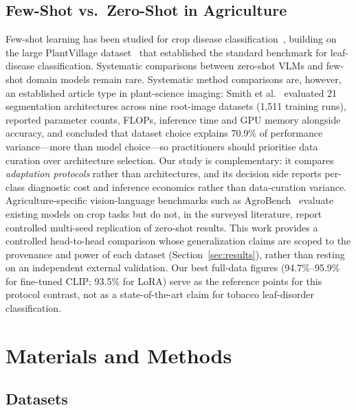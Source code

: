 \documentclass[10pt,a4paper]{article}
\begin{document}
\subsection{Few-Shot vs.\ Zero-Shot in Agriculture}

Few-shot learning has been studied for crop disease classification~\cite{argueso2020fewshot,liang2021cotton}, building on the large PlantVillage dataset~\cite{plantvillage2016} that established the standard benchmark for leaf-disease classification.
Systematic comparisons between zero-shot VLMs and few-shot domain models remain rare.
Systematic method comparisons are, however, an established article type in plant-science imaging: Smith et al.~\cite{smith2026roots} evaluated 21 segmentation architectures across nine root-image datasets (1{,}511 training runs), reported parameter counts, FLOPs, inference time and GPU memory alongside accuracy, and concluded that dataset choice explains 70.9\% of performance variance---more than model choice---so practitioners should prioritise data curation over architecture selection.
Our study is complementary: it compares \emph{adaptation protocols} rather than architectures, and its decision side reports per-class diagnostic cost and inference economics rather than data-curation variance.
Agriculture-specific vision-language benchmarks such as AgroBench~\cite{shinoda2025agrobench} evaluate existing models on crop tasks but do not, in the surveyed literature, report controlled multi-seed replication of zero-shot results.
This work provides a controlled head-to-head comparison whose generalization claims are scoped to the provenance and power of each dataset (Section~\ref{sec:results}), rather than resting on an independent external validation.
Our best full-data figures (94.7\%--95.9\% for fine-tuned CLIP; 93.5\% for LoRA) serve as the reference points for this protocol contrast, not as a state-of-the-art claim for tobacco leaf-disorder classification.

\section{Materials and Methods}
\label{sec:method}

\subsection{Datasets}
\end{document}
